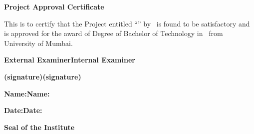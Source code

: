 \newpage
\thispagestyle{empty}
\vspace*{0.2cm}
\vspace{1cm}
\begin{center}
\large\textbf{Project Approval Certificate}
\end{center}
\vspace{2cm}
This is to certify that the Project entitled ``\ProjectTitle'' by \StudentsInline\ is found to be satisfactory and is approved for the award of Degree of Bachelor of Technology in \DegreeBranch\ from University of Mumbai.\par
\vspace{4cm}
\noindent\textbf{External Examiner}\hfill\textbf{Internal Examiner}\par
\vspace{2cm}
\noindent\textbf{(signature)}\hfill\textbf{(signature)}\par
\vspace{1cm}
\noindent\textbf{Name:}\hfill\textbf{Name:}\par
\vspace{2cm}
\noindent\textbf{Date:}\hfill\textbf{Date:}\par
\vspace{2cm}
\begin{center}
\textbf{Seal of the Institute}
\end{center}
